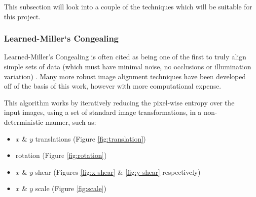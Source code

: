 This subsection will look into a couple of the techniques which will be suitable for this project.

\subsubsection{Learned-Miller`s Congealing}

Learned-Miller's \Gls{Congealing} \cite{joint-alignment} is often cited as being one of the first to truly align simple sets of data (which must have minimal noise, no occlusions or illumination variation) \cite{Zhou_Lee_Yu_Efros_2015} \cite{peng2012rasl}. Many more robust image alignment techniques have been developed off of the basis of this work, however with more computational expense.

This algorithm works by iteratively reducing the pixel-wise entropy over the input images, using a set of standard image transformations, in a \gls{non-deterministic} manner, such as:

\begin{itemize}
  \item $x$ \& $y$ translations (Figure \ref{fig:translation})
  \item rotation (Figure \ref{fig:rotation})
  \item $x$ \& $y$ shear (Figures \ref{fig:x-shear} \& \ref{fig:y-shear} respectively)
  \item $x$ \& $y$ scale (Figure \ref{fig:scale})
\end{itemize}

